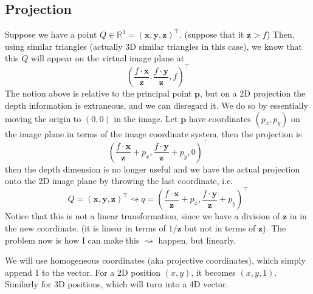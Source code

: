 \documentclass[11pt]{article}
\newcommand{\bp}{\mathbf{p}}
\newcommand{\bx}{\mathbf{x}}
\newcommand{\by}{\mathbf{y}}
\newcommand{\bz}{\mathbf{z}}
\newcommand{\real}{\mathbb{R}}
\begin{document}
\subsection{Projection}
Suppose we have a point $Q\in\real^3 = (\bx, \by, \bz)^\top$. (suppose that it $\bz > f$) Then, using similar triangles (actually 3D similar triangles in this case), we know that this $Q$ will appear on the virtual image plane at
\begin{equation}
	\left(\frac{f \cdot \bx}{\bz}, \frac{f \cdot \by}{\bz}, f\right)^{\top}
\end{equation}
The notion above is relative to the principal point $\bp$, but on a 2D projection the depth information is extraneous, and we can disregard it. We do so by essentially moving the origin to $(0, 0)$ in the image. Let $\bp$ have coordinates $(p_x, p_y)$ on the image plane in terms of the image coordinate system, then the projection is
\begin{equation}
	\left(\frac{f \cdot \bx}{\bz}+p_{x}, \frac{f \cdot \by}{\bz}+p_{y}, 0\right)^{\top}
\end{equation}
then the depth dimension is no longer useful and we have the actual projection onto the 2D image plane by throwing the last coordinate, i.e. 
\begin{equation}
	Q = (\bx, \by, \bz)^\top \rightsquigarrow q = \left(\frac{f \cdot \bx}{\bz}+p_{x}, \frac{f \cdot \by}{\bz}+p_{y}\right)^{\top} \label{eq:perspective projection original}
\end{equation}
Notice that this is not a linear transformation, since we have a division of $\bz$ in in the new coordinate. (it is linear in terms of $1/\bz$ but not in terms of $\bz$). The problem now is how I can make this $\rightsquigarrow$ happen, but linearly. 

We will use homogeneous coordinates (aka projective coordinates), which simply append 1 to the vector. For a 2D position $(x, y)$, it becomes $(x, y, 1)$. Similarly for 3D positions, which will turn into a 4D vector. 
\end{document}
